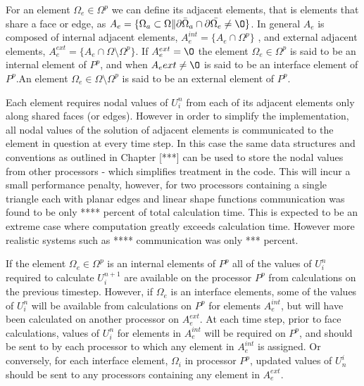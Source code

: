 For an element $\Omega_e \in \Omega^p$ we can define its adjacent elements, that is elements that share a face or edge, as $A_e = \{ \Omega_a \subset \Omega \| \partial \bar{\Omega}_a \cap \partial \bar{\Omega_e} \ne \O \}$. In general $A_e$ is composed of internal adjacent elements, $A_e^{int} = \{ A_e \cap \Omega^p \}$ , and external adjacent elements, $A_e^{ext} = \{ A_e \cap \Omega \setminus \Omega^p \}$. If $A_e^{ext} = \O$ the element $\Omega_e \in \Omega^p$ is said to be an internal element of $P^p$, and when $A_e{ext} \ne \O$ is said to be an interface element of $P^p$.An element $\Omega_e \in \Omega \setminus \Omega^p$ is said to be an external element of $P^p$.


Each element requires nodal values of $U_i^{n}$ from each of its adjacent elements only along shared faces (or edges). However in order to simplify the implementation, all nodal values of the solution of adjacent elements is communicated to the element in question at every time step. In this case the same data structures and conventions as outlined in Chapter [***] can be used to store the nodal values from other processors - which simplifies treatment in the code. This will incur a small performance penalty, however, for two processors containing a single triangle each with planar edges and linear shape functions communication was found to be only **** percent of total calculation time. This is expected to be an extreme case where computation greatly exceeds calculation time. However more realistic systems such as **** communication was only *** percent.

If the element $\Omega_e \in \Omega^p$ is an internal elements of $P^p$ all of the values of $U_i^n$ required to calculate $U_i^{n+1}$ are available on the processor $P^p$ from calculations on the previous timestep. However, if $\Omega_e$ is an interface elements, some of the values of $U_i^{n}$ will be available from calculations on $P^p$ for elements $A_e^{int}$, but will have been calculated on another processor on $A_e^{ext}$. At each time step, prior to face calculations, values of $U_i^{n}$ for elements in $A_e^{int}$ will be required on $P^p$, and should be sent to by each processor to which any element in $A_e^{int}$ is assigned. Or conversely, for each interface element, $\Omega_i$ in processor $P^p$, updated values of $U_n^i$ should be sent to any processors containing any element in $A_e^{ext}$.


